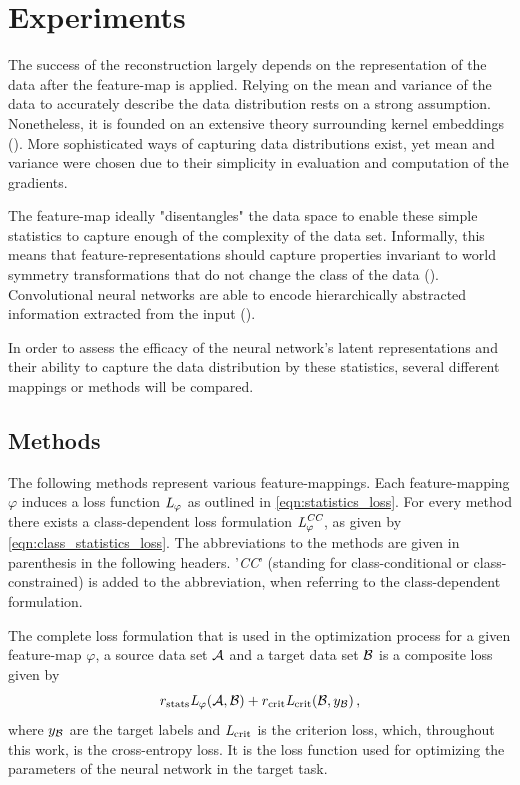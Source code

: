 
\chapter{Experiments}
\label{chap:Experiments} 

The success of the reconstruction largely depends on the representation of the data
after the feature-map is applied.
Relying on the mean and variance of the data to accurately describe the data distribution 
rests on a strong assumption.
Nonetheless, it is founded on an extensive theory surrounding kernel embeddings
(\cite{borgwardt2006integrating,sriperumbudur2010hilbert}).
More sophisticated ways of capturing data distributions exist, yet mean and variance were chosen due to their simplicity in evaluation and computation of the gradients.

The feature-map ideally "disentangles" the data space to enable 
these simple statistics to capture enough of the complexity of the data set.
Informally, this means that feature-representations
should capture properties invariant to world symmetry transformations that
do not change the class of the data (\cite{Disentangling_Def}).
Convolutional neural networks are able to encode hierarchically abstracted 
information extracted from the input (\cite{olah2017feature}).

In order to assess the efficacy of the neural network's latent representations 
and their ability to capture the data distribution by these statistics,
several different mappings or methods will be compared. 


\section{Methods}
\label{sec:methods}

The following methods represent various feature-mappings.
Each feature-mapping $\varphi$ induces a loss function $\textit{L}_\varphi$ as outlined in \cref{eqn:statistics_loss}.
For every method there exists a class-dependent loss formulation $\textit{L}^\textit{CC}_\varphi$,
as given by \cref{eqn:class_statistics_loss}.
The abbreviations to the methods are given in parenthesis in the following headers. 
'\textit{CC}' (standing for class-conditional or class-constrained) is added to the abbreviation,
when referring to the class-dependent formulation.

The complete loss formulation that is used in the optimization process 
for a given feature-map $\varphi$, a source data set $\mathcal A$ and a target data set $\mathcal B$ 
is a composite loss given by
\[
    r_\text{stats}\textit{L}_\varphi(\mathcal A, \mathcal B) + r_\text{crit}\textit{L}_\text{crit}(\mathcal B, y_{\mathcal B}) \,,
\]
where $y_{\mathcal B}$ are the target labels and $\textit{L}_\text{crit}$ is the criterion loss, 
which, throughout this work, is the cross-entropy loss.
It is the loss function used for optimizing the parameters of the neural network
in the target task.



